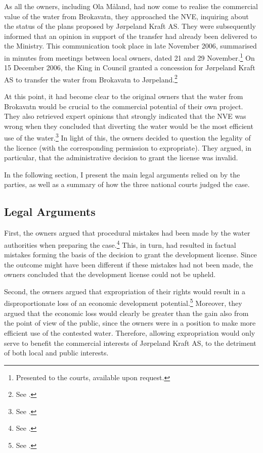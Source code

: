 As all the owners, including Ola Måland, had now come to realise the commercial value of the water from Brokavatn, they approached the NVE, inquiring about the status of the plans proposed by Jørpeland Kraft AS. They were subsequently informed that an opinion in support of the transfer had already been delivered to the Ministry. This communication took place in late November 2006, summarised in minutes from meetings between local owners, dated 21 and 29 November.\footnote{Presented to the courts, available upon request.} On 15 December 2006, the King in Council granted a concession for Jørpeland Kraft AS to transfer the water from Brokavatn to Jørpeland.\footnote{See \cite[3]{jorpeland09}.}

At this point, it had become clear to the original owners that the water from Brokavatn would be crucial to the commercial potential of their own project. They also retrieved expert opinions that strongly indicated that the NVE was wrong when they concluded that diverting the water would be the most efficient use of the water.\footnote{See \cite[23]{jorpeland09}.} In light of this, the owners decided to question the legality of the licence (with the corresponding permission to expropriate). They argued, in particular, that the administrative decision to grant the license was invalid.

In the following section, I present the main legal arguments relied on by the parties, as well as a summary of how the three national courts judged the case.

\subsection{Legal Arguments}\label{sec:5:6:2}

First, the owners argued that procedural mistakes had been made by the water authorities when preparing the case.\footnote{See \cite[12]{jorpeland09}.} This, in turn, had resulted in factual mistakes forming the basis of the decision to grant the development license. Since the outcome might have been different if these mistakes had not been made, the owners concluded that the development license could not be upheld.

Second, the owners argued that expropriation of their rights would result in a disproportionate loss of an economic development potential.\footnote{See \cite[5]{jorpeland11a}.} Moreover, they argued that the economic loss would clearly be greater than the gain also from the point of view of the public, since the owners were in a position to make more efficient use of the contested water. Therefore, allowing expropriation would only serve to benefit the commercial interests of Jørpeland Kraft AS, to the detriment of both local and public interests.

